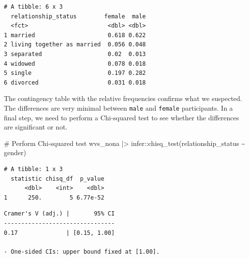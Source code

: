 \documentclass[
  letterpaper,
]{krantz}
\makeatletter
\newenvironment{Shaded}{\begin{snugshade}}{\end{snugshade}}
\newcommand{\AttributeTok}[1]{\textcolor[rgb]{0.40,0.45,0.13}{#1}}
\newcommand{\CommentTok}[1]{\textcolor[rgb]{0.37,0.37,0.37}{#1}}
\newcommand{\FunctionTok}[1]{\textcolor[rgb]{0.28,0.35,0.67}{#1}}
\newcommand{\NormalTok}[1]{\textcolor[rgb]{0.00,0.23,0.31}{#1}}
\newcommand{\OtherTok}[1]{\textcolor[rgb]{0.00,0.23,0.31}{#1}}
\newcommand{\SpecialCharTok}[1]{\textcolor[rgb]{0.37,0.37,0.37}{#1}}
\newcommand{\StringTok}[1]{\textcolor[rgb]{0.13,0.47,0.30}{#1}}
\newenvironment{kframe}{%
\medskip{}
\setlength{\fboxsep}{.8em}
 \def\at@end@of@kframe{}%
 \ifinner\ifhmode%
  \def\at@end@of@kframe{\end{minipage}}%
  \begin{minipage}{\columnwidth}%
 \fi\fi%
 \def\FrameCommand##1{\hskip\@totalleftmargin \hskip-\fboxsep
 \colorbox{shadecolor}{##1}\hskip-\fboxsep
     \hskip-\linewidth \hskip-\@totalleftmargin \hskip\columnwidth}%
 \MakeFramed {\advance\hsize-\width
   \@totalleftmargin\z@ \linewidth\hsize
   \@setminipage}}%
 {\par\unskip\endMakeFramed%
 \at@end@of@kframe}
\renewenvironment{Shaded}{\begin{kframe}}{\end{kframe}}
\makeatother
\begin{document}
\begin{verbatim}
# A tibble: 6 x 3
  relationship_status        female  male
  <fct>                       <dbl> <dbl>
1 married                     0.618 0.622
2 living together as married  0.056 0.048
3 separated                   0.02  0.013
4 widowed                     0.078 0.018
5 single                      0.197 0.282
6 divorced                    0.031 0.018
\end{verbatim}

The contingency table with the relative frequencies confirms what we
suspected. The differences are very minimal between \texttt{male} and
\texttt{female} participants. In a final step, we need to perform a
Chi-squared test to see whether the differences are significant or not.

\begin{Shaded}
\begin{Highlighting}[]
\CommentTok{\# Perform Chi{-}squared test}
\NormalTok{wvs\_nona }\SpecialCharTok{|\textgreater{}}\NormalTok{ infer}\SpecialCharTok{::}\FunctionTok{chisq\_test}\NormalTok{(relationship\_status }\SpecialCharTok{\textasciitilde{}}\NormalTok{ gender)}
\end{Highlighting}
\end{Shaded}

\begin{verbatim}
# A tibble: 1 x 3
  statistic chisq_df  p_value
      <dbl>    <int>    <dbl>
1      250.        5 6.77e-52
\end{verbatim}

\begin{Shaded}
\end{Shaded}

\begin{verbatim}
Cramer's V (adj.) |       95% CI
--------------------------------
0.17              | [0.15, 1.00]

- One-sided CIs: upper bound fixed at [1.00].
\end{verbatim}

\begin{Shaded}
\end{Shaded}
\end{document}
